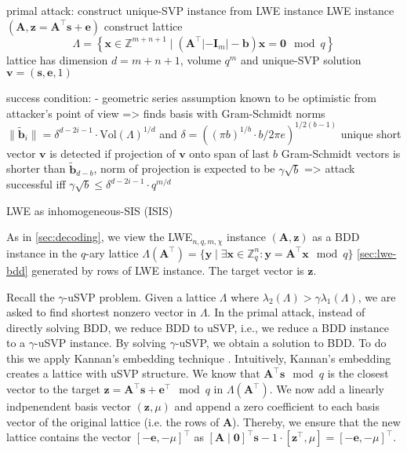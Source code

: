 primal attack: construct unique-SVP instance from LWE instance %
LWE instance $(\mathbf{A}, \mathbf{z} = \mathbf{A}^\intercal \mathbf{s} + \mathbf{e})$
construct lattice
\begin{equation}
  \Lambda = \left\{ \mathbf{x} \in \mathbb{Z}^{m+n+1} \mid (\mathbf{A}^\intercal | -\mathbf{I}_m | -\mathbf{b})\mathbf{x} = \mathbf{0} \mod q \right\}
\end{equation}
lattice has dimension $d=m+n+1$, volume $q^m$ %
and unique-SVP solution $\mathbf{v} = (\mathbf{s}, \mathbf{e}, 1)$ %

success condition:
- geometric series assumption known to be optimistic from attacker's point of view
=> finds basis with Gram-Schmidt norms $\|\tilde{\mathbf{b}}_i\| = \delta^{d - 2i-1} \cdot \text{Vol}(\Lambda)^{1/d}$ and $\delta = ((\pi b)^{1/b} \cdot b/2\pi e)^{1/2(b-1)}$ %
unique short vector $\mathbf{v}$ is detected if projection of $\mathbf{v}$ onto span of last $b$ Gram-Schmidt vectors is shorter than $\tilde{\mathbf{b}}_{d-b}$, norm of projection is expected to be $\gamma \sqrt{b}$ => attack successful iff $\gamma \sqrt{b} \leq \delta^{d - 2i-1} \cdot q^{m/d}$

LWE as inhomogeneous-SIS (ISIS)

As in \cref{sec:decoding}, we view the LWE$_{n, q, m, \chi}$ instance $(\mathbf{A}, \mathbf{z})$ as a BDD instance in the  $q$-ary lattice $\Lambda(\mathbf{A}^\intercal) = \{ \mathbf{y} \mid \exists \mathbf{x} \in \mathbb{Z}_q^n : \mathbf{y} = \mathbf{A}^\intercal \mathbf{x}  \mod q \}$ \cref{sec:lwe-bdd} generated by rows of LWE instance. The target vector is $\mathbf{z}$. %

Recall the $\gamma$-uSVP problem. Given a lattice $\Lambda$ where $\lambda_2(\Lambda) > \gamma \lambda_1(\Lambda)$, we are asked to find shortest nonzero vector in $\Lambda$.
In the primal attack, instead of directly solving BDD, we reduce BDD to uSVP, i.e., we reduce a BDD instance to a $\gamma$-uSVP instance. By solving $\gamma$-uSVP, we obtain a solution to BDD.
To do this we apply Kannan's embedding technique \cite{Kan87}. %
Intuitively, Kannan's embedding creates a lattice with uSVP structure. We know that $\mathbf{A}^\intercal \mathbf{s}\mod q$ is the closest vector to the target $\mathbf{z} =\mathbf{A}^\intercal \mathbf{s} + \mathbf{e}^\intercal \mod q$ in $\Lambda(\mathbf{A}^\intercal)$. We now add a linearly indpenendent basis vector  $(\mathbf{z}, \mu)$ and append a zero coefficient to each basis vector of the original lattice (i.e. the rows of $\mathbf{A}$). Thereby, we ensure that the new lattice contains the vector $[-\mathbf{e}, -\mu]^\intercal$ as $[\mathbf{A} \mid \mathbf{0}]^\intercal \mathbf{s} - 1 \cdot [\mathbf{z}^\intercal, \mu] = [-\mathbf{e}, -\mu]^\intercal$.

